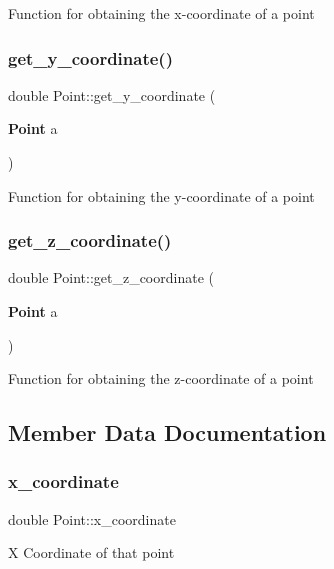 Function for obtaining the x-\/coordinate of a point \mbox{\label{class_point_a29c89ec9a5860cdfbc3ae9b662a0fd7a}} 
\subsubsection{get\+\_\+y\+\_\+coordinate()}
{\footnotesize\ttfamily double Point\+::get\+\_\+y\+\_\+coordinate (\begin{DoxyParamCaption}\item[{\textbf{ Point}}]{a }\end{DoxyParamCaption})\hspace{0.3cm}{\ttfamily [inline]}}

Function for obtaining the y-\/coordinate of a point \mbox{\label{class_point_a2e9a7a82f1590bae32aec8b2a2fcf237}} 
\subsubsection{get\+\_\+z\+\_\+coordinate()}
{\footnotesize\ttfamily double Point\+::get\+\_\+z\+\_\+coordinate (\begin{DoxyParamCaption}\item[{\textbf{ Point}}]{a }\end{DoxyParamCaption})\hspace{0.3cm}{\ttfamily [inline]}}

Function for obtaining the z-\/coordinate of a point 

\subsection{Member Data Documentation}
\mbox{\label{class_point_a1cf9c11aedcd45c74b850d960d580f52}} 
\subsubsection{x\+\_\+coordinate}
{\footnotesize\ttfamily double Point\+::x\+\_\+coordinate}

X Coordinate of that point \mbox{\label{class_point_af06938614d72d2229188f7ed111d1386}} 
